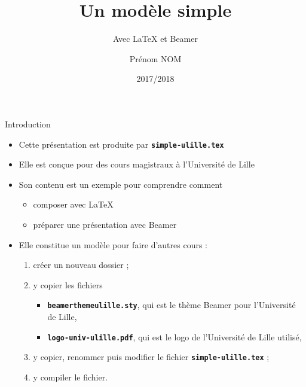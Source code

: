 \documentclass[10pt,t]{beamer}
\title{Un modèle simple}
\subtitle{Avec \LaTeX{} et Beamer}
\author{Prénom NOM}
\institute[]{Université de Lille}
\date{2017/2018}
\begin{document}
\maketitle


\begin{frame}{Introduction} 

  \begin{itemize}
  \item Cette présentation est produite par \texttt{\textbf{simple-ulille.tex}}
  \item Elle est conçue pour des cours magistraux à l'Université de Lille
  \item Son contenu est un exemple pour comprendre comment

    \begin{itemize}
    \item composer avec \LaTeX{}
    \item préparer une présentation avec Beamer
    \end{itemize}

  \end{itemize}

  \pause


  \begin{itemize}
  \item Elle constitue un modèle pour faire d'autres cours :
      
    \begin{enumerate}
    \item créer un nouveau dossier ;
    \item y copier les fichiers 
      
      \begin{itemize}
      \item \texttt{\textbf{beamerthemeulille.sty}}, qui est le thème Beamer pour l'Université de Lille,
      \item \texttt{\textbf{logo-univ-ulille.pdf}}, qui est le logo de l'Université de Lille utilisé,
      \end{itemize}
      
    \item y copier, renommer puis modifier le fichier \texttt{\textbf{simple-ulille.tex}} ;
    \item y compiler le fichier.
    \end{enumerate}
  \end{itemize}
\end{frame}
\end{document}
